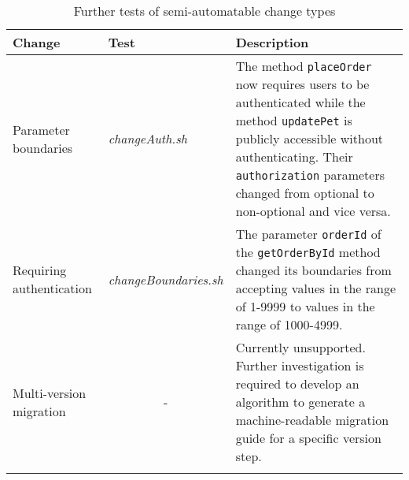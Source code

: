	\begin{center}
	\begin{longtable}{@{}>{\raggedright\arraybackslash}p{}p{}p{}@{}}
		\toprule
		\textbf{Change} & \textbf{Test}  & \textbf{Description} \\ \midrule \endhead
		Parameter boundaries &    \textit{changeAuth.sh}          &         The method \texttt{placeOrder} now requires users to be authenticated while the method \texttt{updatePet} is publicly accessible without authenticating. Their \texttt{authorization} parameters changed from optional to non-optional and vice versa.    \\
		Requiring authentication &          \textit{changeBoundaries.sh}               &      The parameter \texttt{orderId} of the \texttt{getOrderById} method changed its boundaries from accepting values in the range of 1-9999 to values in the range of 1000-4999.         \\ 
		Multi-version migration & \multicolumn{1}{c}{-}  & Currently unsupported. Further investigation is required to develop an algorithm to generate a machine-readable migration guide for a specific version step.  \\
		\bottomrule
		\caption{Further tests of semi-automatable change types}
		\label{tab:OtherSemiAutomatedChangeTypesTests}	
	\end{longtable}
\end{center}
